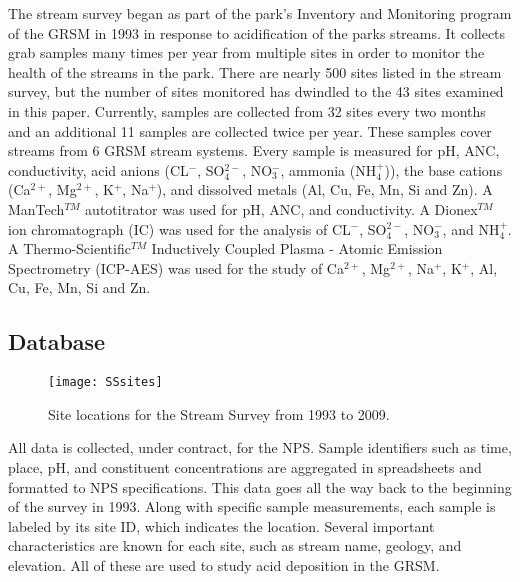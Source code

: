 The stream survey began as part of the park's Inventory and Monitoring program of the GRSM in 1993 in response to acidification of the parks streams.
It collects grab samples many times per year from multiple sites in order to monitor the health of the streams in the park.
There are nearly 500 sites listed in the stream survey, but the number of sites monitored has dwindled to the 43 sites examined in this paper.
Currently, samples are collected from 32 sites every two months and an additional 11 samples are collected twice per year.  
These samples cover streams from 6 GRSM stream systems. 
Every sample is  measured for pH, ANC, conductivity, acid anions (CL$^-$, SO$_4^{2-}$, NO$_3^-$, ammonia (NH$_4^+$)), the base cations (Ca$^{2+}$, Mg$^{2+}$, K$^+$, Na$^+$), and dissolved metals (Al, Cu, Fe, Mn, Si and Zn).  
A ManTech$^{TM}$ autotitrator was used for pH, ANC, and conductivity.  
A Dionex$^{TM}$ ion chromatograph (IC) was used for the analysis of CL$^-$, SO$_4^{2-}$, NO$_3^-$, and NH$_4^+$.  
A Thermo-Scientific$^{TM}$ Inductively Coupled Plasma - Atomic Emission Spectrometry (ICP-AES) was used for the study of Ca$^{2+}$, Mg$^{2+}$, Na$^+$, K$^+$, Al, Cu, Fe, Mn, Si and Zn.

\subsection{Database}

\begin{figure}[h!]
  \centering
  \texttt{[image: SSsites]}\\
  \caption{Site locations for the Stream Survey from 1993 to 2009. }\label{fig:SSsites}
\end{figure}

All data is collected, under contract, for the NPS.
Sample identifiers such as time, place, pH, and constituent concentrations are aggregated in spreadsheets and formatted to NPS specifications.
This data goes all the way back to the beginning of the survey in 1993.
Along with specific sample measurements, each sample is labeled by its site ID, which indicates the location.
Several important characteristics are known for each site, such as stream name, geology, and elevation.
All of these are used to study acid deposition in the GRSM.

